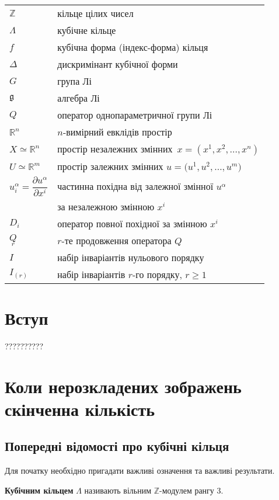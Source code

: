 \documentclass{thesis}
\begin{document}
\begin{tabular}{ll}
$\mathbb{Z}$ & кільце цілих чисел\\
$\Lambda$ & кубічне кільце\\
$f$ & кубічна форма (індекс-форма) кільця\\
$\Delta$ & дискримінант кубічної форми\\
$G$ & група Лі\\
$\mathfrak g$ & алгебра Лі\\
$Q$ & оператор однопараметричної групи Лі\\[1mm]
$\mathbb R^n$ & $n$-вимірний евклідів простір\\[1mm]
$X\simeq {\mathbb R}^n$ & простір незалежних змінних~$x=(x^1,x^2,\ldots, x^n)$ \\[1mm]
$U\simeq {\mathbb R}^m$ & простір залежних змінних $u=\big(u^1, u^2, \ldots, u^m\big)$\\[1mm]
$u^\alpha_i=\dfrac{\partial u^\alpha}{\partial x^i}$ & частинна похідна від залежної змінної $u^\alpha$\\[1mm]
& за незалежною змінною $x^i$\\[1mm]
$D_{i}$ & оператор повної похідної за змінною $x^{i}$\\[1mm]
$\underset{r}{Q}$ & $r$-те продовження оператора $Q$\\[1mm]
$I$ & набір інваріантів нульового порядку\\[1mm]
$I_{(r)}$ & набір інваріантів $r$-го порядку, $r\geq 1$

\end{tabular}


\newpage

\chapter*{Вступ}\label{Introduction}

??????????
\cite{boyko-thesis,boyko2021,PopovychBoykoNesterenkoLutfullin2003}

\newpage

\chapter{Коли нерозкладених зображень скінченна кількість}\label{chaper1}

\section{Попередні відомості про кубічні кільця}\label{section1.1}
Для початку необхідно пригадати важливі означення та важливі результати.
\begin{definition}
\textbf{Кубічним кільцем} $\Lambda$ називають вільним $\mathbb{Z}$-модулем рангу $3$.
\end{definition}
\end{document}
